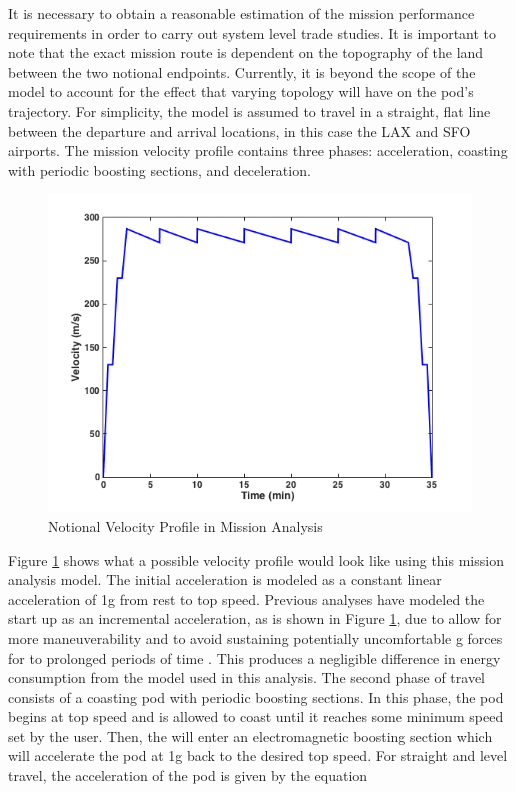 It is necessary to obtain a reasonable estimation of the mission performance requirements in order to carry out system level trade studies. It is important to note that the exact mission route is dependent on the topography of the land between the two notional endpoints. Currently, it is beyond the scope of the model to account for the effect that varying topology will have on the pod’s trajectory. For simplicity, the model is assumed to travel in a straight, flat line between the departure and arrival locations, in this case the LAX and SFO airports. The mission velocity profile contains three phases: acceleration, coasting with periodic boosting sections, and deceleration. 
\begin{figure}
	\centering
	\includegraphics{../images/mission_profile.png}
	\caption{Notional Velocity Profile in Mission Analysis}
	\label{fig:mission_profile}
\end{figure}
Figure \cref{fig:mission_profile} shows what a possible velocity profile would look like using this mission analysis model. The initial acceleration is modeled as a constant linear acceleration of 1g from rest to top speed. Previous analyses have modeled the start up as an incremental acceleration, as is shown in Figure \cref{fig:mission_profile}, due to allow for more maneuverability and to avoid sustaining potentially uncomfortable g forces for to prolonged periods of time \cite{Chin}. This produces a negligible difference in energy consumption from the model used in this analysis. The second phase of travel consists of a coasting pod with periodic boosting sections. In this phase, the pod begins at top speed and is allowed to coast until it reaches some minimum speed set by the user. Then, the will enter an electromagnetic boosting section which will accelerate the pod at 1g back to the desired top speed. For straight and level travel, the acceleration of the pod is given by the equation 

